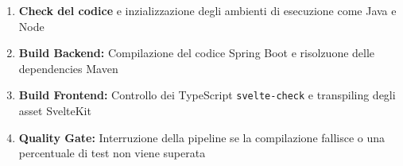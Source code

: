 \begin{enumerate}
    \item \textbf{Check del codice} e inzializzazione degli ambienti di esecuzione come Java e Node
    \item \textbf{Build Backend:} Compilazione del codice Spring Boot e risolzuone delle dependencies Maven
    \item \textbf{Build Frontend:} Controllo dei TypeScript \texttt{svelte-check} e transpiling degli asset SvelteKit
    \item \textbf{Quality Gate:} Interruzione della pipeline se la compilazione fallisce o una percentuale di test non viene superata
\end{enumerate}